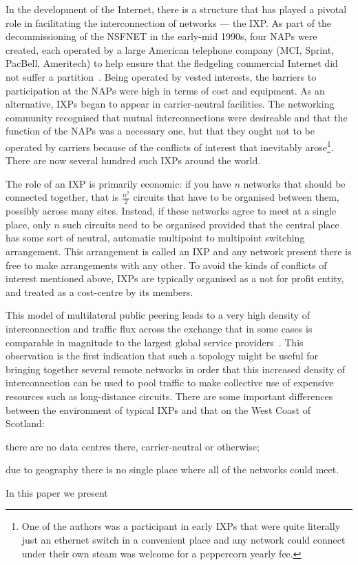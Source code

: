 In the development of the Internet, there is a structure that has
played a pivotal role in facilitating the interconnection of networks
--- the \acf{IXP}. As part of the decommissioning of the \ac{NSFNET}
in the early-mid 1990s, four \acp{NAP} were created, each operated by
a large American telephone company (MCI, Sprint, PacBell, Ameritech)
to help ensure that the fledgeling commercial Internet did not suffer
a
partition~\cite{hayes1997computing,Ager:2012:ALE:2342356.2342393}. Being
operated by vested interests, the barriers to participation at
the \acp{NAP} were high in terms of cost and equipment. As an
alternative, \acp{IXP} began to appear in carrier-neutral
facilities. The networking community recognised that mutual
interconnections were desireable and that the function of
the \acp{NAP} was a necessary one, but that they ought not to be
operated by carriers because of the conflicts of interest that
inevitably arose\footnote{One of the authors was a participant in
early \acp{IXP} that were quite literally just an ethernet switch in a
convenient place and any network could connect under their own steam
was welcome for a peppercorn yearly fee.}. There are now several
hundred such \acp{IXP} around the world.

The role of an \ac{IXP} is primarily economic: if
you have $n$ networks that should be connected together, that is
$\frac{n^2}{2}$ circuits that have to be organised between them,
possibly across many sites. Instead, if these networks agree to meet
at a single place, only $n$ such circuits need to be organised
provided that the central place has some sort of neutral, automatic
multipoint to multipoint switching arrangement. This arrangement is
called an \ac{IXP} and any network present there is free to make
arrangements with any other. To avoid the kinds of conflicts of
interest mentioned above, \acp{IXP} are typically organised as a not
for profit entity, and treated as a cost-centre by its members.

This model of multilateral public peering leads to a very high
density of interconnection and traffic flux across the exchange that
in some cases is comparable in magnitude to the largest global
service providers~\cite{Ager:2012:ALE:2342356.2342393}. This
observation is the first indication that such a topology might be
useful for bringing together several remote networks in order that
this increased density of interconnection can be used to pool traffic
to make collective use of expensive resources such as long-distance
circuits. There are some important differences between the environment
of typical \acp{IXP} and that on the West Coast of Scotland:
\begin{inparaenum}[(i)]
  \item there are no data centres there, carrier-neutral or otherwise;
  \item due to geography there is no single place where all of the
    networks could meet.
\end{inparaenum}

In this paper we present 

